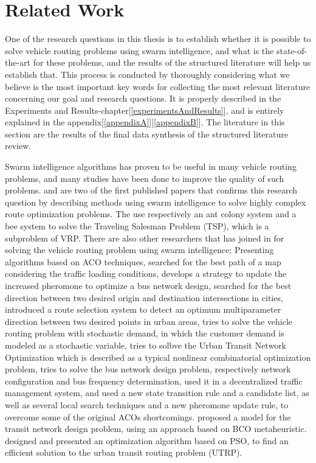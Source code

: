 \section{Related Work} 
One of the research questions in this thesis is to establish whether it is possible to  solve vehicle routing problems using swarm intelligence, and what is the state-of-the-art for these problems, and the results of the structured literature will help us establish that. This process is conducted by thoroughly considering what we believe is the most important key words for collecting the most relevant literature concerning our goal and research questions. It is properly described in the Experiments and Results-chapter[\ref{experimentsAndResults}], and is entirely explained in the appendix[\ref{appendixA}][\ref{appendixB}]. The literature in this section are the results of the final data synthesis of the structured literature review. 
\par
Swarm intelligence algorithms has proven to be useful in many vehicle routing problems, and many studies have been done to improve the quality of such problems. \citet{dorigo97} and \citet{lucic03} are two of the first published papers that confirms this research question by describing methods using swarm intelligence to solve highly complex route optimization problems. The use respectively an ant colony system and a bee system to solve the Traveling Salesman Problem (TSP), which is a subproblem of VRP. There are also other researchers that has joined in for solving the vehicle routing problem using swarm intelligence; 
Presenting algorithms based on ACO techniques, \citet{hsiao04} searched for the best path of a map considering the traffic loading conditions, \citet{yang07} develops a strategy to update the increased pheromone to optimize a bus network design, \citet{salehi-nezhad07} searched for the best direction between two desired origin and destination intersections in cities, \citet{salehinejad10} introduced a route selection system to detect an optimum multiparameter direction between two desired points in urban areas, \citet{tripathi09} tries to solve the vehicle routing problem with stochastic demand, in which the customer demand is modeled as a stochastic variable, \citet{jiang10} tries to solbve the Urban Transit Network Optimization which is described as a typical nonlinear combinatorial optimization problem, \citet{poorzahedy11} tries to solve the bus network design problem, respectively network configuration and bus frequency determination, \citet{dias14} used it in a decentralized traffic management system, and \citet{sedighpour14} used a new state transition rule and a candidate list, as well as several local search techniques and a new pheromone update rule, to overcome some of the original ACOs shortcomings.  \citet{nikolic14} proposed a model for the transit network design problem, using an approach based on BCO metaheuristic. \citet{kechagiopoulos14} designed and presented an optimization algorithm based on PSO, to find an efficient solution to the urban transit routing problem (UTRP). 

